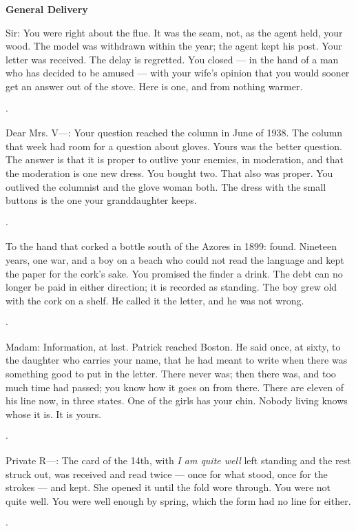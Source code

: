 \documentclass[11pt]{article}
\newcommand{\separator}{\begin{center}\vspace{5pt}$\cdot$\vspace{5pt}\end{center}}
\begin{document}
\begin{center}
{\LARGE\bfseries General Delivery}
\end{center}
\bigskip
\noindent Sir: You were right about the flue. It was the seam, not, as the agent held, your wood. The model was withdrawn within the year; the agent kept his post. Your letter was received. The delay is regretted. You closed — in the hand of a man who has decided to be amused — with your wife's opinion that you would sooner get an answer out of the stove. Here is one, and from nothing warmer.

\separator

\noindent Dear Mrs. V—: Your question reached the column in June of 1938. The column that week had room for a question about gloves. Yours was the better question. The answer is that it is proper to outlive your enemies, in moderation, and that the moderation is one new dress. You bought two. That also was proper. You outlived the columnist and the glove woman both. The dress with the small buttons is the one your granddaughter keeps.

\separator

\noindent To the hand that corked a bottle south of the Azores in 1899: found. Nineteen years, one war, and a boy on a beach who could not read the language and kept the paper for the cork's sake. You promised the finder a drink. The debt can no longer be paid in either direction; it is recorded as standing. The boy grew old with the cork on a shelf. He called it the letter, and he was not wrong.

\separator

\noindent Madam: Information, at last. Patrick reached Boston. He said once, at sixty, to the daughter who carries your name, that he had meant to write when there was something good to put in the letter. There never was; then there was, and too much time had passed; you know how it goes on from there. There are eleven of his line now, in three states. One of the girls has your chin. Nobody living knows whose it is. It is yours.

\separator

\noindent Private R—: The card of the 14th, with \emph{I am quite well} left standing and the rest struck out, was received and read twice — once for what stood, once for the strokes — and kept. She opened it until the fold wore through. You were not quite well. You were well enough by spring, which the form had no line for either.

\separator
\end{document}
